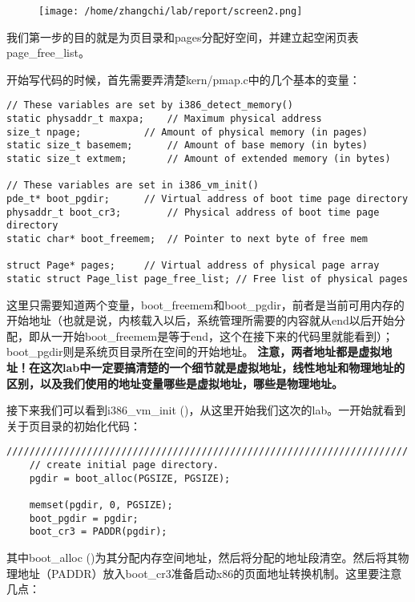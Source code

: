\documentclass{article}
\newcommand{\highlight}[1]{{\bfseries \color{red}  #1}}
\newcommand{\funcname}[1]{{\ttfamily \small #1}}
\begin{document}
\begin{CJK*}{UTF8}{gkai}
\begin{figure}[htp]
\centering
\texttt{[image: /home/zhangchi/lab/report/screen2.png]}
\end{figure}

我们第一步的目的就是为页目录和pages分配好空间，并建立起空闲页表page\_free\_list。


开始写代码的时候，首先需要弄清楚kern/pmap.c中的几个基本的变量：

\begin{lstlisting}[style=ccode, firstnumber=12, title={\scriptsize \ttfamily \bfseries kern/pmap.c}]
// These variables are set by i386_detect_memory()
static physaddr_t maxpa;	// Maximum physical address
size_t npage;			// Amount of physical memory (in pages)
static size_t basemem;		// Amount of base memory (in bytes)
static size_t extmem;		// Amount of extended memory (in bytes)

// These variables are set in i386_vm_init()
pde_t* boot_pgdir;		// Virtual address of boot time page directory
physaddr_t boot_cr3;		// Physical address of boot time page directory
static char* boot_freemem;	// Pointer to next byte of free mem

struct Page* pages;		// Virtual address of physical page array
static struct Page_list page_free_list;	// Free list of physical pages
\end{lstlisting}

这里只需要知道两个变量，boot\_freemem和boot\_pgdir，前者是当前可用内存的开始地址（也就是说，内核载入以后，系统管理所需要的内容就从end以后开始分配，即从一开始boot\_freemem是等于end，这个在接下来的代码里就能看到）；boot\_pgdir则是系统页目录所在空间的开始地址。\highlight{注意，两者地址都是虚拟地址！在这次lab中一定要搞清楚的一个细节就是虚拟地址，线性地址和物理地址的区别，以及我们使用的地址变量哪些是虚拟地址，哪些是物理地址。}


接下来我们可以看到\funcname{i386\_vm\_init ()}，从这里开始我们这次的lab。一开始就看到关于页目录的初始化代码：

\begin{lstlisting}[style=ccode, title={\scriptsize \ttfamily \bfseries kern/pmap.c: i386\_vm\_init ()}]
	//////////////////////////////////////////////////////////////////////
	// create initial page directory.
	pgdir = boot_alloc(PGSIZE, PGSIZE);

	memset(pgdir, 0, PGSIZE);
	boot_pgdir = pgdir;
	boot_cr3 = PADDR(pgdir);
\end{lstlisting}

其中\funcname{boot\_alloc ()}为其分配内存空间地址，然后将分配的地址段清空。然后将其物理地址（PADDR）放入boot\_cr3准备启动x86的页面地址转换机制。这里要注意几点：


\end{CJK*}
\end{document}
